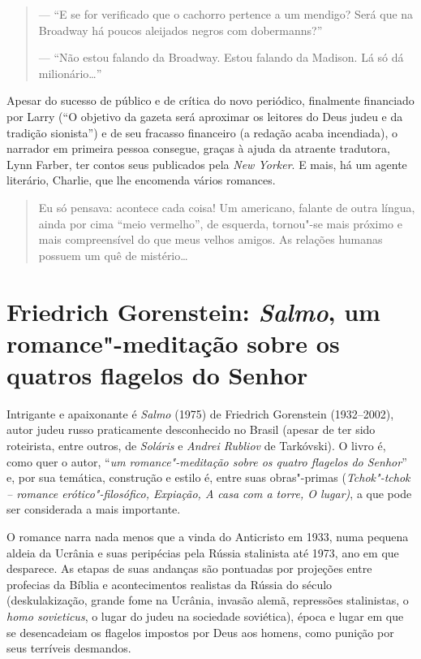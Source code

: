 {{{\begin{quote}
--- ``E se for verificado que o cachorro pertence a um mendigo? Será que na Broadway há poucos aleijados negros com dobermanns?''

--- ``Não estou falando da Broadway. Estou falando da Madison. Lá só dá milionário\ldots{}''
\end{quote}

Apesar do sucesso de público e de crítica do novo periódico, finalmente financiado por Larry (``O objetivo da gazeta será aproximar os leitores do Deus judeu e da tradição sionista'') e de seu fracasso financeiro (a redação acaba incendiada), o narrador em primeira pessoa consegue, graças à ajuda da atraente tradutora, Lynn Farber, ter contos seus  publicados pela \emph{New Yorker}. E mais, há um agente literário, Charlie, que lhe encomenda vários romances.

\begin{quote}
Eu só pensava: acontece cada coisa! Um americano, falante de outra língua, ainda por cima ``meio vermelho'', de esquerda, tornou"-se mais próximo e mais compreensível do que meus velhos amigos. As relações humanas possuem um quê de mistério\ldots{}
\end{quote}

\chapter*{Friedrich Gorenstein: \emph{Salmo}, um romance"-meditação sobre os quatros flagelos do Senhor}


Intrigante e apaixonante é \emph{Salmo} (1975) de Friedrich Gorenstein (1932--2002), autor judeu russo praticamente desconhecido no Brasil (apesar de ter sido roteirista, entre outros, de \emph{Soláris}
e \emph{Andrei Rubliov} de Tarkóvski). O livro é, como quer o autor,
``\emph{um romance"-meditação sobre os quatro flagelos do Senhor}'' e,
por sua temática, construção e estilo é, entre suas obras"-primas
(\emph{Tchok"-tchok -- romance erótico"-filosófico, Expiação, A casa com a
torre, O lugar)}, a que pode ser considerada a mais importante.

O romance narra nada menos que a vinda do Anticristo em 1933, numa
pequena aldeia da Ucrânia e suas peripécias pela Rússia stalinista até
1973, ano em que desparece. As etapas de suas andanças são pontuadas por
projeções entre profecias da Bíblia e acontecimentos realistas da Rússia
do século  (deskulakização, grande fome na Ucrânia, invasão alemã,
repressões stalinistas, o \emph{homo sovieticus}, o lugar do judeu na
sociedade soviética), época e lugar em que se desencadeiam os flagelos
impostos por Deus aos homens, como punição por seus terríveis desmandos.

}}}
